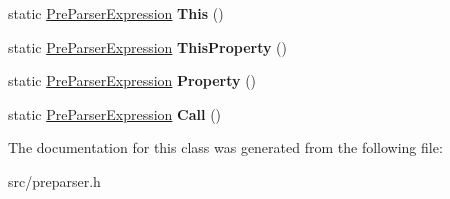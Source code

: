 \begin{DoxyCompactItemize}
\item 
\hypertarget{classv8_1_1internal_1_1_pre_parser_expression_a68d8db6e0595163c7d1744a07cc6b929}{}static \hyperlink{classv8_1_1internal_1_1_pre_parser_expression}{Pre\+Parser\+Expression} {\bfseries This} ()\label{classv8_1_1internal_1_1_pre_parser_expression_a68d8db6e0595163c7d1744a07cc6b929}

\item 
\hypertarget{classv8_1_1internal_1_1_pre_parser_expression_a03645560e89dddef2f8140c0a34d10e4}{}static \hyperlink{classv8_1_1internal_1_1_pre_parser_expression}{Pre\+Parser\+Expression} {\bfseries This\+Property} ()\label{classv8_1_1internal_1_1_pre_parser_expression_a03645560e89dddef2f8140c0a34d10e4}

\item 
\hypertarget{classv8_1_1internal_1_1_pre_parser_expression_a75e5fbbb27c812d7bbe639fd165759a0}{}static \hyperlink{classv8_1_1internal_1_1_pre_parser_expression}{Pre\+Parser\+Expression} {\bfseries Property} ()\label{classv8_1_1internal_1_1_pre_parser_expression_a75e5fbbb27c812d7bbe639fd165759a0}

\item 
\hypertarget{classv8_1_1internal_1_1_pre_parser_expression_a612d0bdc0086787b6909bb6425650f40}{}static \hyperlink{classv8_1_1internal_1_1_pre_parser_expression}{Pre\+Parser\+Expression} {\bfseries Call} ()\label{classv8_1_1internal_1_1_pre_parser_expression_a612d0bdc0086787b6909bb6425650f40}

\end{DoxyCompactItemize}


The documentation for this class was generated from the following file\+:\begin{DoxyCompactItemize}
\item 
src/preparser.\+h\end{DoxyCompactItemize}
